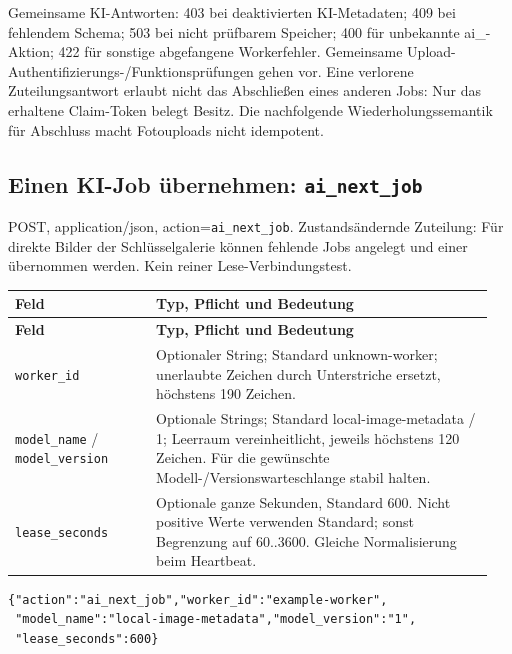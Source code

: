 \documentclass[11pt,a4paper]{article}
\newcommand{\codeword}[1]{\nolinkurl{#1}}
\begin{document}
Gemeinsame KI-Antworten: 403 bei deaktivierten KI-Metadaten; 409 bei fehlendem Schema; 503
bei nicht prüfbarem Speicher; 400 für unbekannte ai\_-Aktion; 422 für sonstige abgefangene
Workerfehler. Gemeinsame Upload-Authentifizierungs-/Funktionsprüfungen gehen vor. Eine
verlorene Zuteilungsantwort erlaubt nicht das Abschließen eines anderen Jobs: Nur das
erhaltene Claim-Token belegt Besitz. Die nachfolgende Wiederholungssemantik für Abschluss
macht Fotouploads nicht idempotent.

\subsection{\texorpdfstring{Einen KI-Job übernehmen: \codeword{ai_next_job}}{Einen KI-Job übernehmen: ai\_next\_job}}

\label{api352:ai-next-job}

POST, application/json, action=\codeword{ai_next_job}. Zustandsändernde Zuteilung: Für
direkte Bilder der Schlüsselgalerie können fehlende Jobs angelegt und einer übernommen
werden. Kein reiner Lese-Verbindungstest.

\begin{longtable}{@{}>{\RaggedRight\arraybackslash}p{0.28\linewidth}>{\RaggedRight\arraybackslash}p{0.67\linewidth}@{}}
\toprule
\textbf{Feld} & \textbf{Typ, Pflicht und Bedeutung} \\
\midrule
\endfirsthead
\toprule
\textbf{Feld} & \textbf{Typ, Pflicht und Bedeutung} \\
\midrule
\endhead
\bottomrule
\endfoot
\codeword{worker_id} & Optionaler String; Standard unknown-worker; unerlaubte Zeichen durch
Unterstriche ersetzt, höchstens 190 Zeichen. \\
\codeword{model_name} / \codeword{model_version} & Optionale Strings; Standard
local-image-metadata / 1; Leerraum vereinheitlicht, jeweils höchstens 120 Zeichen. Für die
gewünschte Modell-/Versionswarteschlange stabil halten. \\
\codeword{lease_seconds} & Optionale ganze Sekunden, Standard 600. Nicht positive Werte
verwenden Standard; sonst Begrenzung auf 60..3600. Gleiche Normalisierung beim Heartbeat. \\
\end{longtable}

\begin{lstlisting}[language={}]
{"action":"ai_next_job","worker_id":"example-worker",
 "model_name":"local-image-metadata","model_version":"1",
 "lease_seconds":600}
\end{lstlisting}
\end{document}
